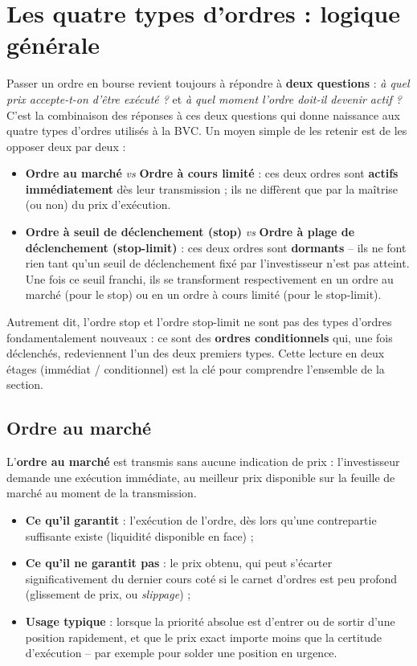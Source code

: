 \documentclass{rapportENSIAS} %
\begin{document}
\section{Les quatre types d'ordres : logique générale}

\noindent
Passer un ordre en bourse revient toujours à répondre à \textbf{deux questions} : \textit{à quel prix accepte-t-on d'être exécuté ?} et \textit{à quel moment l'ordre doit-il devenir actif ?} C'est la combinaison des réponses à ces deux questions qui donne naissance aux quatre types d'ordres utilisés à la BVC. Un moyen simple de les retenir est de les opposer deux par deux :

\begin{itemize}
    \item \textbf{Ordre au marché} \textit{vs} \textbf{Ordre à cours limité} : ces deux ordres sont \textbf{actifs immédiatement} dès leur transmission ; ils ne diffèrent que par la maîtrise (ou non) du prix d'exécution.
    \item \textbf{Ordre à seuil de déclenchement (stop)} \textit{vs} \textbf{Ordre à plage de déclenchement (stop-limit)} : ces deux ordres sont \textbf{dormants} -- ils ne font rien tant qu'un seuil de déclenchement fixé par l'investisseur n'est pas atteint. Une fois ce seuil franchi, ils se transforment respectivement en un ordre au marché (pour le stop) ou en un ordre à cours limité (pour le stop-limit).
\end{itemize}

\noindent
Autrement dit, l'ordre stop et l'ordre stop-limit ne sont pas des types d'ordres fondamentalement nouveaux : ce sont des \textbf{ordres conditionnels} qui, une fois déclenchés, redeviennent l'un des deux premiers types. Cette lecture en deux étages (immédiat / conditionnel) est la clé pour comprendre l'ensemble de la section.

\subsection{Ordre au marché}

\noindent
L'\textbf{ordre au marché} est transmis sans aucune indication de prix : l'investisseur demande une exécution immédiate, au meilleur prix disponible sur la feuille de marché au moment de la transmission.

\begin{itemize}
    \item \textbf{Ce qu'il garantit} : l'exécution de l'ordre, dès lors qu'une contrepartie suffisante existe (liquidité disponible en face) ;
    \item \textbf{Ce qu'il ne garantit pas} : le prix obtenu, qui peut s'écarter significativement du dernier cours coté si le carnet d'ordres est peu profond (glissement de prix, ou \textit{slippage}) ;
    \item \textbf{Usage typique} : lorsque la priorité absolue est d'entrer ou de sortir d'une position rapidement, et que le prix exact importe moins que la certitude d'exécution -- par exemple pour solder une position en urgence.
\end{itemize}
\end{document}
